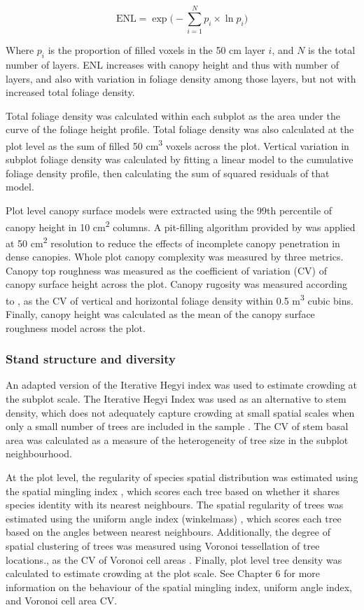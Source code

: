 \documentclass[11pt,a4paper]{article}
\begin{document}
\begin{equation}
	\text{ENL} = \exp\Big(-\sum_{i=1}^{N} p_{i} \times \ln p_{i} \Big)
\end{equation}

Where $p_{i}$ is the proportion of filled voxels in the 50 cm layer $i$, and $N$ is the total number of layers. ENL increases with canopy height and thus with number of layers, and also with variation in foliage density among those layers, but not with increased total foliage density.

Total foliage density was calculated within each subplot as the area under the curve of the foliage height profile. Total foliage density was also calculated at the plot level as the sum of filled 50 cm\textsuperscript{3} voxels across the plot. Vertical variation in subplot foliage density was calculated by fitting a linear model to the cumulative foliage density profile, then calculating the sum of squared residuals of that model. 

Plot level canopy surface models were extracted using the 99th percentile of canopy height in 10 cm\textsuperscript{2} columns. A pit-filling algorithm provided by \citet{Khosravipour2014} was applied at 50 cm\textsuperscript{2} resolution to reduce the effects of incomplete canopy penetration in dense canopies. Whole plot canopy complexity was measured by three metrics. Canopy top roughness was measured as the coefficient of variation (CV) of canopy surface height across the plot. Canopy rugosity was measured according to \citet{Hardiman2011}, as the CV of vertical and horizontal foliage density within 0.5 m\textsuperscript{3} cubic bins. Finally, canopy height was calculated as the mean of the canopy surface roughness model across the plot.

\subsubsection{Stand structure and diversity}

An adapted version of the Iterative Hegyi index was used to estimate crowding at the subplot scale. The Iterative Hegyi Index was used as an alternative to stem density, which does not adequately capture crowding at small spatial scales when only a small number of trees are included in the sample \citep{Hegyi1974}. The CV of stem basal area was calculated as a measure of the heterogeneity of tree size in the subplot neighbourhood. 

At the plot level, the regularity of species spatial distribution was estimated using the spatial mingling index \citep{Gadow2002}, which scores each tree based on whether it shares species identity with its nearest neighbours. The spatial regularity of trees was estimated using the uniform angle index (winkelmass) \citep{Gadow2002}, which scores each tree based on the angles between nearest neighbours. Additionally, the degree of spatial clustering of trees was measured using Voronoi tessellation of tree locations., as the CV of Voronoi cell areas \citep{Ong2012}. Finally, plot level tree density was calculated to estimate crowding at the plot scale. See Chapter 6 for more information on the behaviour of the spatial mingling index, uniform angle index, and Voronoi cell area CV.
\end{document}
